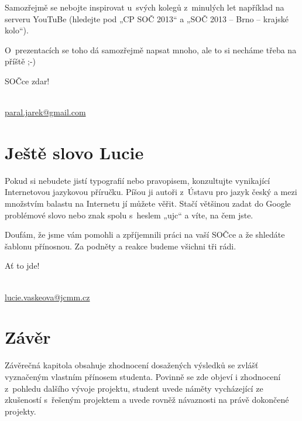 \documentclass{template/socthesis}
\begin{document}
Samozřejmě se nebojte inspirovat u~svých kolegů z~minulých let například na serveru YouTuBe (hledejte pod „CP SOČ 2013“ a „SOČ 2013 – Brno – krajské kolo“).

O~prezentacích se toho dá samozřejmě napsat mnoho, ale to si necháme třeba na příště ;-)

\vspace{\baselineskip}
\noindent SOČce zdar!

\vspace{\baselineskip}
\noindent {}\\
\url{paral.jarek@gmail.com}

\chapter{Ještě slovo Lucie}
Pokud si nebudete jistí typografií nebo pravopisem, konzultujte vynikající Internetovou jazykovou příručku.
Píšou ji autoři z~Ústavu pro jazyk český a mezi množstvím balastu na Internetu jí můžete věřit.
Stačí většinou zadat do Google problémové slovo nebo znak spolu s~heslem „ujc“ a víte, na čem jste.

Doufám, že jsme vám pomohli a zpříjemnili práci na vaší SOČce a že shledáte šablonu přínosnou.
Za podněty a reakce budeme všichni tři rádi.

\vspace{\baselineskip}
\noindent Ať to jde!

\vspace{\baselineskip}
\noindent {} \\
\url{lucie.vaskeova@jcmm.cz}

\newpage
\chapter*{Závěr}

Závěrečná kapitola obsahuje zhodnocení dosažených výsledků se zvlášť vyznačeným vlastním přínosem studenta.
Povinně se zde objeví i zhodnocení z~pohledu dalšího vývoje projektu, student uvede náměty vycházející ze zkušeností s~řešeným projektem a uvede rovněž návaznosti na právě dokončené projekty.

\newpage
\printbibliography[title=Literatura]

\listoffigures
{}

\listoftables
{}

\listoflistedequation
{}
\end{document}
